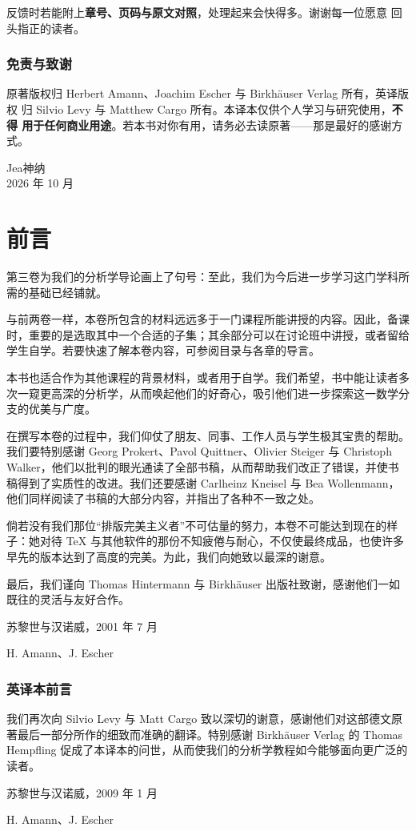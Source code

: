 反馈时若能附上\textbf{章号、页码与原文对照}，处理起来会快得多。谢谢每一位愿意
回头指正的读者。

\subsection*{免责与致谢}

原著版权归 Herbert Amann、Joachim Escher 与 Birkhäuser Verlag 所有，英译版权
归 Silvio Levy 与 Matthew Cargo 所有。本译本仅供个人学习与研究使用，\textbf{不得
用于任何商业用途}。若本书对你有用，请务必去读原著——那是最好的感谢方式。

\vspace{2ex}
\begin{flushright}
Jea神纳\\
2026 年 10 月
\end{flushright}
\chapter*{前言}

第三卷为我们的分析学导论画上了句号：至此，我们为今后进一步学习这门学科所需的基础已经铺就。

与前两卷一样，本卷所包含的材料远远多于一门课程所能讲授的内容。因此，备课时，重要的是选取其中一个合适的子集；其余部分可以在讨论班中讲授，或者留给学生自学。若要快速了解本卷内容，可参阅目录与各章的导言。

本书也适合作为其他课程的背景材料，或者用于自学。我们希望，书中能让读者多次一窥更高深的分析学，从而唤起他们的好奇心，吸引他们进一步探索这一数学分支的优美与广度。

在撰写本卷的过程中，我们仰仗了朋友、同事、工作人员与学生极其宝贵的帮助。我们要特别感谢 Georg Prokert、Pavol Quittner、Olivier Steiger 与 Christoph Walker，他们以批判的眼光通读了全部书稿，从而帮助我们改正了错误，并使书稿得到了实质性的改进。我们还要感谢 Carlheinz Kneisel 与 Bea Wollenmann，他们同样阅读了书稿的大部分内容，并指出了各种不一致之处。

倘若没有我们那位“排版完美主义者”不可估量的努力，本卷不可能达到现在的样子：她对待 TeX 与其他软件的那份不知疲倦与耐心，不仅使最终成品，也使许多早先的版本达到了高度的完美。为此，我们向她致以最深的谢意。

最后，我们谨向 Thomas Hintermann 与 Birkhäuser 出版社致谢，感谢他们一如既往的灵活与友好合作。

苏黎世与汉诺威，2001 年 7 月

H. Amann、J. Escher

\subsection*{英译本前言}

我们再次向 Silvio Levy 与 Matt Cargo 致以深切的谢意，感谢他们对这部德文原著最后一部分所作的细致而准确的翻译。特别感谢 Birkhäuser Verlag 的 Thomas Hempfling 促成了本译本的问世，从而使我们的分析学教程如今能够面向更广泛的读者。

苏黎世与汉诺威，2009 年 1 月

H. Amann、J. Escher
